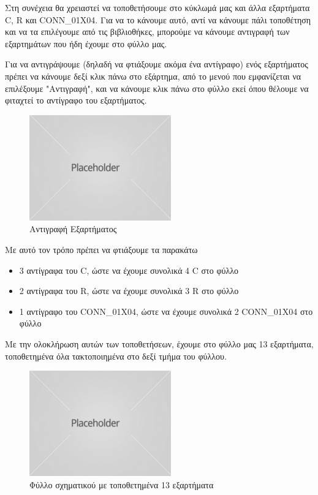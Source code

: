\documentclass[a4paper]{article}
\begin{document}
Στη συνέχεια θα χρειαστεί να τοποθετήσουμε στο κύκλωμά μας και άλλα εξαρτήματα C, R και CONN\_01X04. Για να το κάνουμε αυτό, αντί να κάνουμε πάλι τοποθέτηση και να τα επιλέγουμε από τις βιβλιοθήκες, μπορούμε να κάνουμε αντιγραφή των εξαρτημάτων που ήδη έχουμε στο φύλλο μας. 

Για να αντιγράψουμε (δηλαδή να φτιάξουμε ακόμα ένα αντίγραφο) ενός εξαρτήματος πρέπει να κάνουμε δεξί κλικ πάνω στο εξάρτημα, από το μενού που εμφανίζεται να επιλέξουμε "Αντιγραφή", και να κάνουμε κλικ πάνω στο φύλλο εκεί όπου θέλουμε να φιταχτεί το αντίγραφο του εξαρτήματος. 

\begin{figure}
  \begin{center}
    \includegraphics{img/kicad-main.png}
    \caption{Αντιγραφή Εξαρτήματος}
    \label{fig:kicad-main}
  \end{center}
\end{figure}

Με αυτό τον τρόπο πρέπει να φτιάξουμε τα παρακάτω

\begin{itemize}
    \item 3 αντίγραφα του C, ώστε να έχουμε συνολικά 4 C στο φύλλο
    \item 2 αντίγραφα του R, ώστε να έχουμε συνολικά 3 R στο φύλλο
    \item 1 αντίγραφο του CONN\_01X04, ώστε να έχουμε συνολικά 2 CONN\_01X04 στο φύλλο
\end{itemize}

Με την ολοκλήρωση αυτών των τοποθετήσεων, έχουμε στο φύλλο μας 13 εξαρτήματα, τοποθετημένα όλα τακτοποιημένα στο δεξί τμήμα του φύλλου.

\begin{figure}
  \begin{center}
    \includegraphics{img/kicad-main.png}
    \caption{Φύλλο σχηματικού με τοποθετημένα 13 εξαρτήματα}
    \label{fig:kicad-main}
  \end{center}
\end{figure}
\end{document}
